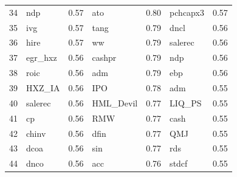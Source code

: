 \begin{footnotesize}
\begin{longtable}{rlc|lc|lc}
		34                        & ndp                         & 0.57                          & ato                         & 0.80                          & pchcapx3                          & 0.57           \\
		35                        & ivg                         & 0.57                          & tang                        & 0.79                          & dncl                              & 0.56           \\
		36                        & hire                        & 0.57                          & ww                          & 0.79                          & salerec                           & 0.56           \\
		37                        & egr\_hxz                    & 0.56                          & cashpr                      & 0.79                          & ndp                               & 0.56           \\
		38                        & roic                        & 0.56                          & adm                         & 0.79                          & ebp                               & 0.56           \\
		39                        & HXZ\_IA                     & 0.56                          & IPO                         & 0.78                          & adm                               & 0.55           \\
		40                        & salerec                     & 0.56                          & HML\_Devil                  & 0.77                          & LIQ\_PS                           & 0.55           \\
		41                        & cp                          & 0.56                          & RMW                         & 0.77                          & cash                              & 0.55           \\
		42                        & chinv                       & 0.56                          & dfin                        & 0.77                          & QMJ                               & 0.55           \\
		43                        & dcoa                        & 0.56                          & sin                         & 0.77                          & rds                               & 0.55           \\
		44                        & dnco                        & 0.56                          & acc                         & 0.76                          & stdcf                             & 0.55           \\

\end{longtable}
\end{footnotesize}
